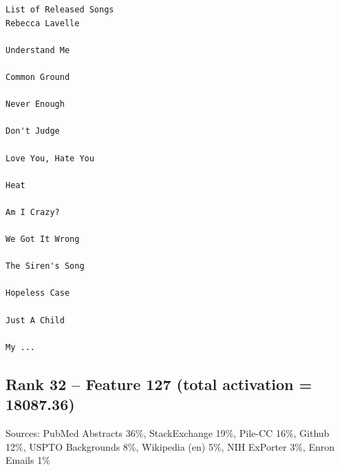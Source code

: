 \begin{verbatim}
List of Released Songs
Rebecca Lavelle

Understand Me 

Common Ground

Never Enough

Don't Judge

Love You, Hate You

Heat

Am I Crazy?

We Got It Wrong

The Siren's Song

Hopeless Case

Just A Child

My ...

\end{verbatim}

\subsection*{Rank 32 -- Feature 127 (total activation = 18087.36)}

Sources: PubMed Abstracts 36\%, StackExchange 19\%, Pile-CC 16\%, Github 12\%, USPTO Backgrounds 8\%, Wikipedia (en) 5\%, NIH ExPorter 3\%, Enron Emails 1\%

